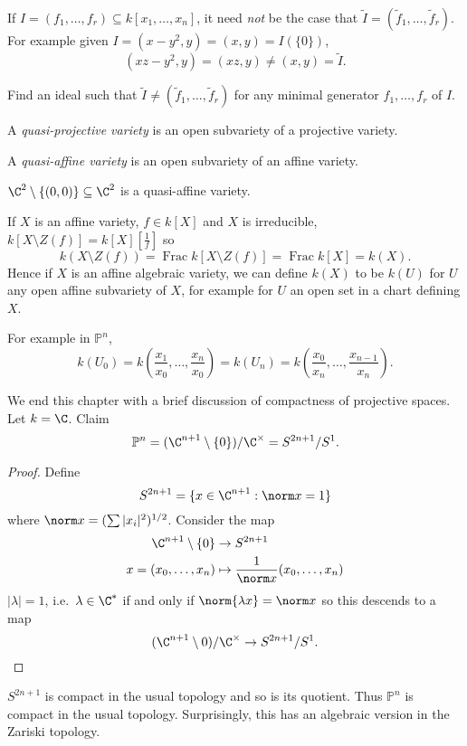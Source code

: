 \documentclass[a4paper]{article}
\renewcommand*{\P}{\mathbb{P}}
\begin{document}
\begin{note}
  If \(I = (f_1, \dots, f_r) \subseteq k[x_1, \dots, x_n]\), it need \emph{not} be the case that \(\tilde I = (\tilde f_1, \dots, \tilde f_r)\). For example given \(I = (x - y^2, y) = (x, y) = I(\{0\})\),
  \[
    (xz - y^2, y) = (xz, y) \neq (x, y) = \tilde I.
  \]
\end{note}

\begin{ex}
  Find an ideal such that \(\tilde I \neq (\tilde f_1, \dots, \tilde f_r)\) for any minimal generator \(f_1, \dots, f_r\) of \(I\).
\end{ex}

\begin{definition}
  A \emph{quasi-projective variety} is an open subvariety of a projective variety.

  A \emph{quasi-affine variety} is an open subvariety of an affine variety.
\end{definition}

\begin{eg}
  \(\C^2 \setminus \{(0, 0)\} \subseteq \C^2\) is a quasi-affine variety.
\end{eg}

\begin{remark}
  If \(X\) is an affine variety, \(f \in k[X]\) and \(X\) is irreducible, \(k[X \setminus Z(f)] = k[X][\frac{1}{f}]\) so
  \[
    k(X \setminus Z(f)) = \operatorname{Frac} k[X \setminus Z(f)] = \operatorname{Frac} k[X] = k(X).
  \]
  Hence if \(X\) is an affine algebraic variety, we can define \(k(X)\) to be \(k(U)\) for \(U\) any open affine subvariety of \(X\), for example for \(U\) an open set in a chart defining \(X\).

  For example in \(\P^n\),
  \[
    k(U_0)
    = k(\frac{x_1}{x_0}, \dots, \frac{x_n}{x_0})
    = k(U_n)
    = k(\frac{x_0}{x_n}, \dots, \frac{x_{n - 1}}{x_n}).
  \]
\end{remark}

We end this chapter with a brief discussion of compactness of projective spaces. Let \(k = \C\). Claim
\[
  \P^n = (\C^{n + 1} \setminus \{0\}) / \C^\times = S^{2n + 1}/S^1.
\]

\begin{proof}
  Define
  \[
    S^{2n + 1} = \{x \in \C^{n + 1}: \norm x = 1\}
  \]
  where \(\norm x = (\sum |x_i|^2)^{1/2}\). Consider the map
  \begin{align*}
    \C^{n + 1} \setminus \{0\} &\to S^{2n + 1} \\
    x = (x_0, \dots, x_n) &\mapsto \frac{1}{\norm x} (x_0, \dots, x_n)
  \end{align*}
  \(|\lambda| = 1\), i.e.\ \(\lambda \in \C^*\) if and only if \(\norm{\lambda x} = \norm x\) so this descends to a map
  \[
    (\C^{n + 1} \setminus 0)/ \C^\times \to S^{2n + 1}/S^1.
  \]
\end{proof}
\(S^{2n + 1}\) is compact in the usual topology and so is its quotient. Thus \(\P^n\) is compact in the usual topology. Surprisingly, this has an algebraic version in the Zariski topology.
\end{document}
